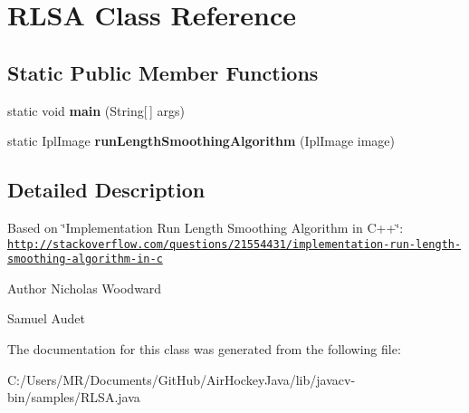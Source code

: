 \hypertarget{class_r_l_s_a}{}\section{R\+L\+S\+A Class Reference}
\label{class_r_l_s_a}
\subsection*{Static Public Member Functions}
\begin{DoxyCompactItemize}
\item 
\hypertarget{class_r_l_s_a_a19d1d814cff1a79a550f2aab71004715}{}static void {\bfseries main} (String\mbox{[}$\,$\mbox{]} args)\label{class_r_l_s_a_a19d1d814cff1a79a550f2aab71004715}

\item 
\hypertarget{class_r_l_s_a_a8e281a2ee6e241b7d368dcc96c642d4e}{}static Ipl\+Image {\bfseries run\+Length\+Smoothing\+Algorithm} (Ipl\+Image image)\label{class_r_l_s_a_a8e281a2ee6e241b7d368dcc96c642d4e}

\end{DoxyCompactItemize}


\subsection{Detailed Description}
Based on \char`\"{}\+Implementation Run Length Smoothing Algorithm in C++\char`\"{}\+: \href{http://stackoverflow.com/questions/21554431/implementation-run-length-smoothing-algorithm-in-c}{\tt http\+://stackoverflow.\+com/questions/21554431/implementation-\/run-\/length-\/smoothing-\/algorithm-\/in-\/c}

\begin{DoxyAuthor}{Author}
Nicholas Woodward 

Samuel Audet 
\end{DoxyAuthor}


The documentation for this class was generated from the following file\+:\begin{DoxyCompactItemize}
\item 
C\+:/\+Users/\+M\+R/\+Documents/\+Git\+Hub/\+Air\+Hockey\+Java/lib/javacv-\/bin/samples/R\+L\+S\+A.\+java\end{DoxyCompactItemize}
